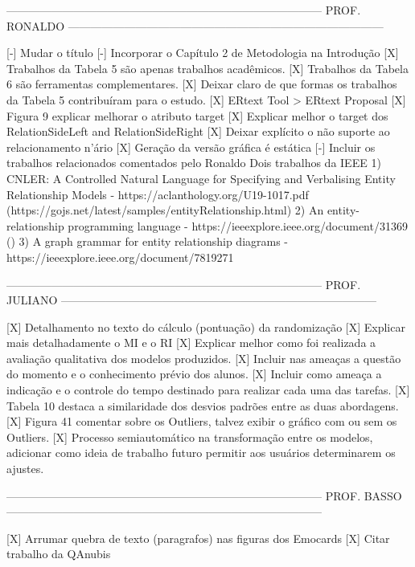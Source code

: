 ------------------------------------------------------------------------------------
PROF. RONALDO
------------------------------------------------------------------------------------

[-] Mudar o título
[-] Incorporar o Capítulo 2 de Metodologia na Introdução
[X] Trabalhos da Tabela 5 são apenas trabalhos acadêmicos.
[X] Trabalhos da Tabela 6 são ferramentas complementares.
[X] Deixar claro de que formas os trabalhos da Tabela 5 contribuíram para o estudo.
[X] ERtext Tool > ERtext Proposal
[X] Figura 9 explicar melhorar o atributo target
[X] Explicar melhor o target dos RelationSideLeft and RelationSideRight
[X] Deixar explícito o não suporte ao relacionamento n'ário
[X] Geração da versão gráfica é estática
[-] Incluir os trabalhos relacionados comentados pelo Ronaldo
	Dois trabalhos da IEEE
	1) CNLER: A Controlled Natural Language for Specifying and Verbalising Entity Relationship Models - https://aclanthology.org/U19-1017.pdf 
			(https://gojs.net/latest/samples/entityRelationship.html)
	2) An entity-relationship programming language - https://ieeexplore.ieee.org/document/31369 ()
	3) A graph grammar for entity relationship diagrams - https://ieeexplore.ieee.org/document/7819271

------------------------------------------------------------------------------------
PROF. JULIANO
------------------------------------------------------------------------------------

[X] Detalhamento no texto do cálculo (pontuação) da randomização
[X] Explicar mais detalhadamente o MI e o RI
[X] Explicar melhor como foi realizada a avaliação qualitativa dos modelos produzidos.
[X] Incluir nas ameaças a questão do momento e o conhecimento prévio dos alunos.
[X] Incluir como ameaça a indicação e o controle do tempo destinado para realizar cada uma das tarefas.
[X] Tabela 10 destaca a similaridade dos desvios padrões entre as duas abordagens.
[X] Figura 41 comentar sobre os Outliers, talvez exibir o gráfico com ou sem os Outliers.
[X] Processo semiautomático na transformação entre os modelos, adicionar como ideia de trabalho futuro permitir aos usuários determinarem os ajustes.

------------------------------------------------------------------------------------
PROF. BASSO
------------------------------------------------------------------------------------

[X] Arrumar quebra de texto (paragrafos) nas figuras dos Emocards
[X] Citar trabalho da QAnubis 


